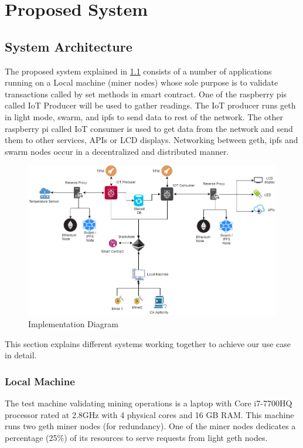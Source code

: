 \documentclass[11pt,openright]{report}
\begin{document}
\chapter{Proposed System} \label{chapter:proposed_system}
\section{System Architecture} \label{ss:construct_architecture}
The proposed system explained in \ref{fig:impldiagram_architechture} consists of a number of applications running on a Local machine (miner nodes) whose sole purpose is to validate transactions called by set methods in smart contract. One of the raspberry pis called IoT Producer will be used to gather readings. The IoT producer runs geth in light mode, swarm, and ipfs to send data to rest of the network. The other raspberry pi called IoT consumer is used to get data from the network and send them to other services, APIs or LCD displays. Networking between geth, ipfs and swarm nodes occur in a decentralized and distributed manner.

\begin{figure}
	\centering
	\includegraphics[scale=0.5]{images/Final_Implementationv2.png}
	\caption{Implementation Diagram}
	\label{fig:impldiagram_architechture}
\end{figure}

This section explains different systems working together to achieve our use case in detail.

\subsection{Local Machine}
The test machine validating mining operations is a laptop with Core i7-7700HQ processor rated at 2.8GHz with 4 physical cores and 16 GB RAM. This machine runs two geth miner nodes (for redundancy). One of the miner nodes dedicates a percentage (25\%) of its resources to serve requests from light geth nodes.
\end{document}
